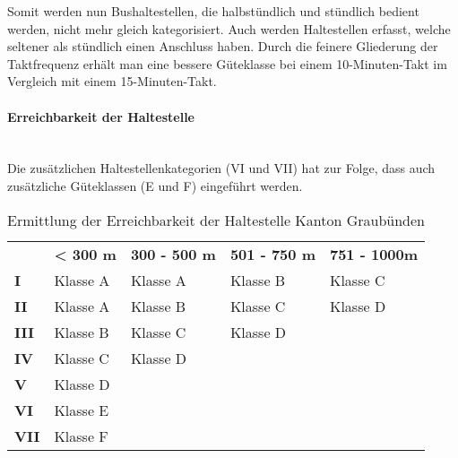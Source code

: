 Somit werden nun Bushaltestellen, die halbstündlich und stündlich bedient werden, nicht mehr gleich kategorisiert.
Auch werden Haltestellen erfasst, welche seltener als stündlich einen Anschluss haben.
Durch die feinere Gliederung der Taktfrequenz erhält man eine bessere Güteklasse bei einem 10-Minuten-Takt im Vergleich mit einem 15-Minuten-Takt.

\paragraph{Erreichbarkeit der Haltestelle}~\\
\label{Berechnungsmethodik Kanton Graubünden:Erreichbarkeit der Haltestelle}
Die zusätzlichen Haltestellenkategorien (VI und VII) hat zur Folge, dass auch zusätzliche Güteklassen (E und F) eingeführt werden.

\begin{table}[ht]
    \begin{tabular}[c]{l p{3.3cm} p{3.3cm} p{3.3cm} p{3.3cm}}
        \midrule
        \textbf{}
                                & \textbf{< 300 m}
                                & \textbf{300 - 500 m}
                                & \textbf{501 - 750 m}
                                & \textbf{751 - 1000m}\\
        \textbf{I}
                                & Klasse A
                                & Klasse A
                                & Klasse B
                                & Klasse C\\
        \textbf{II}
                                & Klasse A
                                & Klasse B
                                & Klasse C
                                & Klasse D\\
        \textbf{III}
                                & Klasse B
                                & Klasse C
                                & Klasse D
                                &\\
        \textbf{IV}
                                & Klasse C
                                & Klasse D
                                &
                                &\\
        \textbf{V}
                                & Klasse D
                                &
                                &
                                &\\
        \cellcolor{red!25}\textbf{VI}
                                & \cellcolor{red!25}Klasse E
                                &
                                &
                                &\\
        \cellcolor{red!25}\textbf{VII}
                                & \cellcolor{red!25}Klasse F
                                &
                                &
                                &\\                                
        \bottomrule
    \end{tabular}
    \caption{Ermittlung der Erreichbarkeit der Haltestelle Kanton Graubünden}
    \label{table:Ermittlung Erreichbarkeit der Haltestelle Kanton Graubünden}
\end{table}


